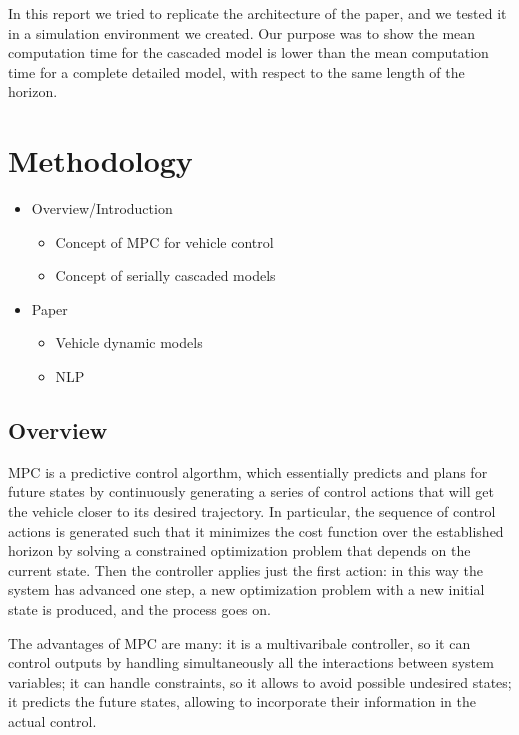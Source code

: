 \documentclass[a4paper, twocolumn, 11pt, twoside]{article}
\begin{document}
In this report we tried to replicate the architecture of the paper, and we tested it in a simulation environment we created.
Our purpose was to show the mean computation time for the cascaded model is lower than the mean computation time for a complete
detailed model, with respect to the same length of the horizon.

\section{Methodology}

\begin{itemize}
    \item Overview/Introduction
    \begin{itemize}
        \item Concept of MPC for vehicle control
        \item Concept of serially cascaded models 
    \end{itemize}

    \item Paper
    \begin{itemize}
        \item Vehicle dynamic models
        \item NLP
    \end{itemize}    
\end{itemize}

\subsection*{Overview}
MPC is a predictive control algorthm, which essentially predicts and plans for future states by continuously generating a series 
of control actions that will get the vehicle closer to its desired trajectory. In particular, the sequence of control actions 
is generated such that it minimizes the cost function over the established horizon by solving a constrained optimization problem
that depends on the current state. Then the controller applies just the first action: in this way the system has advanced one step,
a new optimization problem with a new initial state is produced, and the process goes on.

The advantages of MPC are many: it is a multivaribale controller, so it can control outputs by handling simultaneously all the 
interactions between system variables; it can handle constraints, so it allows to avoid possible undesired states;
it predicts the future states, allowing to incorporate their information in the actual control. 
\end{document}
